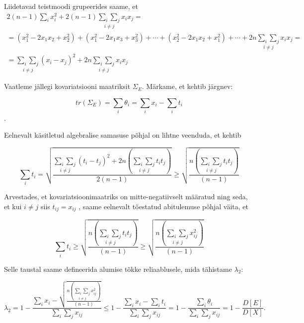 \documentclass[a4paper,12pt]{article}
\numberwithin{equation}{section}
\theoremstyle{definition}
\begin{document}
Liidetavad teistmoodi grupeerides saame, et
\begin{equation*}
\begin{gathered}
2 \left( n-1 \right) \sum_i x_i^2 + 2 \left( n-1 \right) \underset{i \neq j}{\sum_i \sum_j} x_i x_j = \\
= \left( x_{1}^2 - 2 x_1 x_2 + x_{2}^2 \right) + \left( x_{1}^2 - 2 x_1 x_3 + x_{3}^2 \right) + \cdots + \left( x_{2}^2 - 2 x_1 x_2 + x_{1}^2 \right) + \cdots + 2n \underset{i \neq j}{\sum_i \sum_j} x_i x_j = \\
= \underset{i \neq j}{\sum_i \sum_j} (x_i -  x_j)^2 + 2n \underset{i \neq j}{\sum_i \sum_j} x_i x_j
\end{gathered}
\end{equation*}

Vaatleme jällegi kovariatsiooni maatriksit $\Sigma_E$. Märkame, et kehtib järgnev:

\begin{equation*}
tr \left( \Sigma_E \right) = \sum_i \theta_i = \sum_i x_i - \sum_i t_i 
\end{equation*}.

Eelnevalt käsitletud algebralise samasuse põhjal on lihtne veenduda, et kehtib

\begin{equation*}
\sum_i t_i = \sqrt{\frac{\underset{i \neq j}{\sum_i \sum_j} (t_i -  t_j)^2 + 2n \left( \underset{i \neq j}{\sum_i \sum_j} t_i t_j \right) }{2 \left( n -1 \right)}} \geq \sqrt{\frac{ n \left( \underset{i \neq j}{\sum_i \sum_j} t_i t_j \right) }{\left( n -1 \right)}}
\end{equation*}

Arvestades, et kovariatsioonimaatriks on mitte-negatiivselt määratud ning seda, et kui $i \neq j$ siis $t_{ij} = x_{ij}$ , saame eelnevalt tõestatud abitulemuse põhjal väita, et

\begin{equation*}
\sum_i t_i  \geq \sqrt{\frac{ n \left( \underset{i \neq j}{\sum_i \sum_j} t_i t_j \right) }{\left( n -1 \right)}} \geq \sqrt{\frac{ n \left( \underset{i \neq j}{\sum_i \sum_j} x_{ij}^2 \right) }{\left( n -1 \right)}}
\end{equation*} 

Selle taustal saame defineerida alumise tõkke reliaablusele, mida tähistame $\lambda_2$:

\begin{equation*}
\lambda_2 = 1 - \frac{\sum_i x_i - \sqrt{\frac{ n \left( \underset{i \neq j}{\sum_i \sum_j} x_{ij}^2 \right) }{\left( n -1 \right)}}}{\sum_i \sum_j x_{ij}} \leq 1 - \frac{\sum_i x_i - \sum_i t_i}{\sum_i \sum_j x_{ij}} =   1 - \frac{\sum_i \theta_i}{\sum_i \sum_j x_{ij}} =  1 - \frac{D \left[ E \right]}{D \left[ X \right]} \text{.}
\end{equation*}
\end{document}
